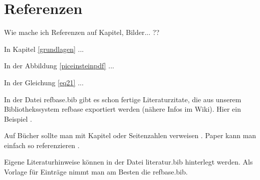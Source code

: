 \chapter{Referenzen}
\label{referenzen}
\thispagestyle{empty}


Wie mache ich Referenzen auf Kapitel, Bilder... ??

In Kapitel \ref{grundlagen} ...

In der Abbildung \ref{piceinsteinpdf}  ...

In der Gleichung \ref{eq21} ...

In der Datei refbase.bib gibt es schon fertige Literaturzitate, die aus unserem Bibliothekssystem refbase exportiert werden (n\"ahere Infos im Wiki). Hier ein Beispiel \cite{riedel02}. 

Auf B\"ucher sollte man mit Kapitel \cite[Chap. 5]{belytschko00} oder Seitenzahlen verweisen \cite[pp. 239--240]{belytschko00}. Paper kann man einfach so referenzieren \cite{calkins12}.


Eigene Literaturhinweise k\"onnen in der Datei literatur.bib hinterlegt werden. Als Vorlage f\"ur Eintr\"age nimmt man am Besten die refbase.bib.

